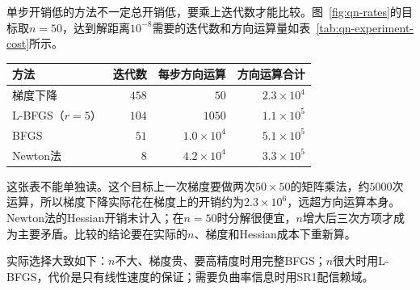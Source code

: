 单步开销低的方法不一定总开销低，要乘上迭代数才能比较。图~\ref{fig:qn-rates}的目标取$n=50$，达到解距离$10^{-8}$需要的迭代数和方向运算量如表~\ref{tab:qn-experiment-cost}所示。

\begin{BookInlineTable}
  \centering
  \begin{tabular}{lrrr}
    \toprule
    方法 & 迭代数 & 每步方向运算 & 方向运算合计\\
    \midrule
    梯度下降 & $458$ & $50$ & $2.3\times10^{4}$\\
    L-BFGS（$r=5$） & $104$ & $1050$ & $1.1\times10^{5}$\\
    BFGS & $51$ & $1.0\times10^{4}$ & $5.1\times10^{5}$\\
    Newton法 & $8$ & $4.2\times10^{4}$ & $3.3\times10^{5}$\\
    \bottomrule
  \end{tabular}
  \caption{图~\ref{fig:qn-rates}的目标（$n=50$）上达到解距离$10^{-8}$的迭代数与方向运算量，不含梯度和Hessian的计算。}
  \label{tab:qn-experiment-cost}
\end{BookInlineTable}

这张表不能单独读。这个目标上一次梯度要做两次$50\times50$的矩阵乘法，约$5000$次运算，所以梯度下降实际花在梯度上的开销约为$2.3\times10^{6}$，远超方向运算本身。Newton法的Hessian开销未计入；在$n=50$时分解很便宜，$n$增大后三次方项才成为主要矛盾。比较的结论要在实际的$n$、梯度和Hessian成本下重新算。

实际选择大致如下：$n$不大、梯度贵、要高精度时用完整BFGS；$n$很大时用L-BFGS，代价是只有线性速度的保证；需要负曲率信息时用SR1配信赖域。
